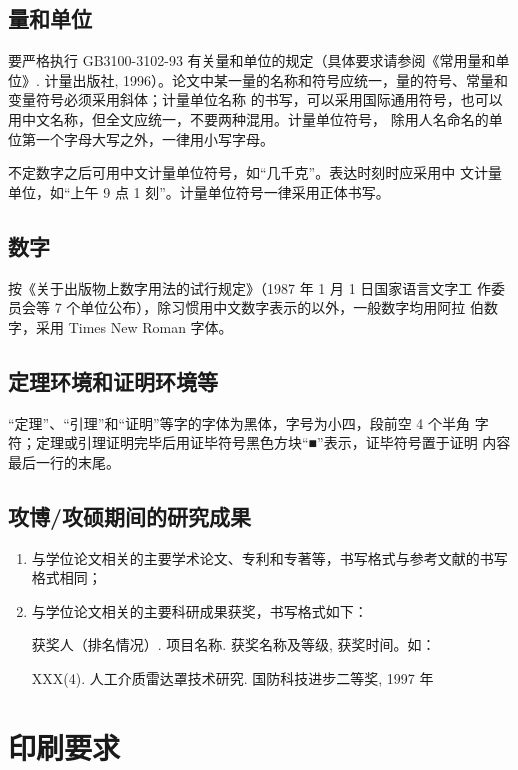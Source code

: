 \subsection{量和单位}
\label{sec:unit}

要严格执行 GB3100-3102-93 有关量和单位的规定（具体要求请参阅《常用量和单位》. 计量出版社,
1996）。论文中某一量的名称和符号应统一，量的符号、常量和变量符号必须采用斜体；计量单位名称
的书写，可以采用国际通用符号，也可以用中文名称，但全文应统一，不要两种混用。计量单位符号，
除用人名命名的单位第一个字母大写之外，一律用小写字母。

不定数字之后可用中文计量单位符号，如“几千克”。表达时刻时应采用中
文计量单位，如“上午 9 点 1 刻”。计量单位符号一律采用正体书写。

\subsection{数字}
\label{sec:dig}

按《关于出版物上数字用法的试行规定》（1987 年 1 月 1 日国家语言文字工
作委员会等 7 个单位公布），除习惯用中文数字表示的以外，一般数字均用阿拉
伯数字，采用 Times New Roman 字体。

\subsection{定理环境和证明环境等}
\label{sec:theorem}

“定理”、“引理”和“证明”等字的字体为黑体，字号为小四，段前空 4 个半角
字符；定理或引理证明完毕后用证毕符号黑色方块“■”表示，证毕符号置于证明
内容最后一行的末尾。

\subsection{攻博/攻硕期间的研究成果}
\label{sec:paper}

\begin{enumerate}
\item 与学位论文相关的主要学术论文、专利和专著等，书写格式与参考文献的书写格式相同；
\item 与学位论文相关的主要科研成果获奖，书写格式如下：
  
  获奖人（排名情况）. 项目名称. 获奖名称及等级, 获奖时间。如：
  
  XXX(4). 人工介质雷达罩技术研究. 国防科技进步二等奖, 1997 年
\end{enumerate}

\section{印刷要求}
\label{sec:prn}

